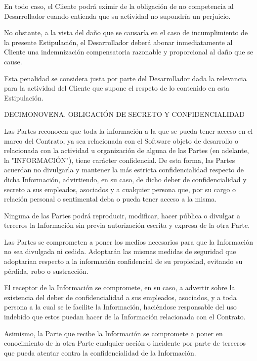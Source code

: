 \documentclass[a4paper,11pt]{report}
\begin{document}
	En todo caso, el Cliente podrá eximir de la obligación de no competencia
	al Desarrollador cuando entienda que su actividad no supondría un
	perjuicio.
	
	No obstante, a la vista del daño que se causaría en el caso de
	incumplimiento de la presente Estipulación, el Desarrollador deberá
	abonar inmediatamente al Cliente una indemnización compensatoria
	razonable y proporcional al daño que se cause.
	
	Esta penalidad se considera justa por parte del Desarrollador dada la
	relevancia para la actividad del Cliente que supone el respeto de lo
	contenido en esta Estipulación.
	
	DECIMONOVENA. OBLIGACIÓN DE SECRETO Y CONFIDENCIALIDAD
	
	Las Partes reconocen que toda la información a la que se pueda tener
	acceso en el marco del Contrato, ya sea relacionada con el Software
	objeto de desarrollo o relacionada con la actividad u organización de
	alguna de las Partes (en adelante, la "INFORMACIÓN"), tiene carácter
	confidencial. De esta forma, las Partes acuerdan no divulgarla y
	mantener la más estricta confidencialidad respecto de dicha Información,
	advirtiendo, en su caso, de dicho deber de confidencialidad y secreto a
	sus empleados, asociados y a cualquier persona que, por su cargo o
	relación personal o sentimental deba o pueda tener acceso a la misma.
	
	Ninguna de las Partes podrá reproducir, modificar, hacer pública o
	divulgar a terceros la Información sin previa autorización escrita y
	expresa de la otra Parte.
	
	Las Partes se comprometen a poner los medios necesarios para que la
	Información no sea divulgada ni cedida. Adoptarán las mismas medidas de
	seguridad que adoptarían respecto a la información confidencial de su
	propiedad, evitando su pérdida, robo o sustracción.
	
	El receptor de la Información se compromete, en su caso, a advertir
	sobre la existencia del deber de confidencialidad a sus empleados,
	asociados, y a toda persona a la cual se le facilite la Información,
	haciéndose responsable del uso indebido que estos puedan hacer de la
	Información relacionada con el Contrato.
	
	Asimismo, la Parte que recibe la Información se compromete a poner en
	conocimiento de la otra Parte cualquier acción o incidente por parte de
	terceros que pueda atentar contra la confidencialidad de la Información.
	
\end{document}
